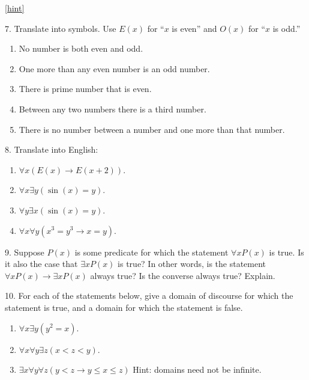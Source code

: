 \documentclass[10pt,]{book}
\theoremstyle{plain}
\theoremstyle{definition}
\theoremstyle{definition}
\theoremstyle{definition}
\numberwithin{equation}{chapter}
\def\imp{\rightarrow}
\newcommand{\lt}{<}
\begin{document}
\begin{exerciselist}
\par\smallskip
\hfill{\tiny\hyperlink{a-B.1.6}{[hint]}\hypertarget{q-B.1.6}{}}\item[7.]\hypertarget{exercise-62}{}\hypertarget{p-1908}{}%
Translate into symbols. Use \(E(x)\) for ``\(x\) is even'' and \(O(x)\) for ``\(x\) is odd.''%
\leavevmode%
\begin{enumerate}[label=(\alph*)]
\item\hypertarget{li-216}{}\hypertarget{p-1909}{}%
No number is both even and odd.%
\item\hypertarget{li-217}{}\hypertarget{p-1910}{}%
One more than any even number is an odd number.%
\item\hypertarget{li-218}{}\hypertarget{p-1911}{}%
There is prime number that is even.%
\item\hypertarget{li-219}{}\hypertarget{p-1912}{}%
Between any two numbers there is a third number.%
\item\hypertarget{li-220}{}\hypertarget{p-1913}{}%
There is no number between a number and one more than that number.%
\end{enumerate}
\par\smallskip
\item[8.]\hypertarget{exercise-63}{}\hypertarget{p-1915}{}%
Translate into English: \leavevmode%
\begin{enumerate}[label=(\alph*)]
\item\hypertarget{li-226}{}\(\forall x (E(x) \imp E(x +2))\).%
\item\hypertarget{li-227}{}\(\forall x \exists y (\sin(x) = y)\).%
\item\hypertarget{li-228}{}\(\forall y \exists x (\sin(x) = y)\).%
\item\hypertarget{li-229}{}\(\forall x \forall y (x^3 = y^3 \imp x = y)\).%
\end{enumerate}
%
\par\smallskip
\item[9.]\hypertarget{exercise-64}{}\hypertarget{p-1921}{}%
Suppose \(P(x)\) is some predicate for which the statement \(\forall x P(x)\) is true. Is it also the case that \(\exists x P(x)\) is true? In other words, is the statement \(\forall x P(x) \imp \exists x P(x)\) always true? Is the converse always true? Explain.%
\par\smallskip
\item[10.]\hypertarget{exercise-65}{}\hypertarget{p-1922}{}%
For each of the statements below, give a domain of discourse for which the statement is true, and a domain for which the statement is false.%
\par
\hypertarget{p-1923}{}%
\leavevmode%
\begin{enumerate}[label=(\alph*)]
\item\hypertarget{li-234}{}\(\forall x \exists y (y^2 = x)\).%
\item\hypertarget{li-235}{}\(\forall x \forall y \exists z (x \lt  z \lt  y)\).%
\item\hypertarget{li-236}{}\(\exists x \forall y \forall z (y \lt  z \imp y \le x \le z)\) Hint: domains need not be infinite.%
\end{enumerate}
%
\par\smallskip
\end{exerciselist}
\end{document}
